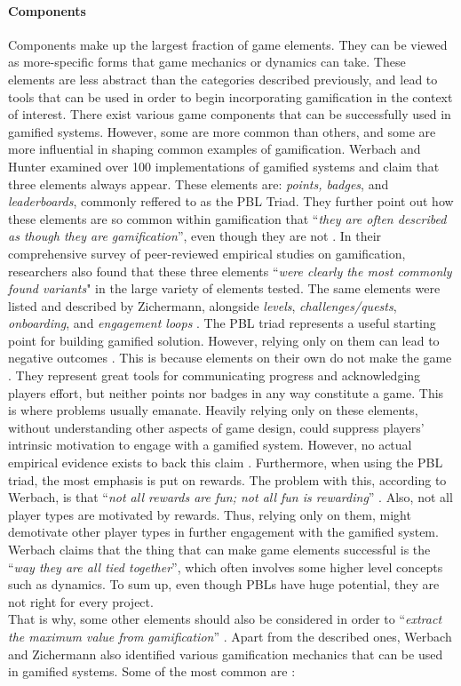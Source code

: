 \paragraph{Components}
Components make up the largest fraction of game elements. They can be viewed as more-specific forms that game mechanics or dynamics can take. These elements are less abstract than the categories described previously, and lead to tools that can be used in order to begin incorporating gamification in the context of interest. There exist various game components that can be successfully used in gamified systems. However, some are more common than others, and some are more influential in shaping common examples of gamification. Werbach and Hunter \cite{werbach2012win} examined over 100 implementations of gamified systems and claim that three elements always appear. These elements are: \textit{points, badges}, and \textit{leaderboards}, commonly reffered to as the PBL Triad. They further point out how these elements are so common within gamification that ``\textit{they are often described as though they are gamification}'', even though they are not \cite{werbach2012win}.  In their comprehensive survey of peer-reviewed empirical studies on gamification, researchers \cite{hamari2014does} also found that these three elements ``\textit{were clearly the most commonly found variants}" in the large variety of elements tested. The same elements were listed and described by Zichermann, alongside \textit{levels}, \textit{challenges/quests}, \textit{onboarding}, and \textit{engagement loops} \cite{zichermann2011gamification}. The PBL triad represents a useful starting point for building gamified solution. However, relying only on them can lead to negative outcomes \cite{werbach2012win}. This is because elements on their own do not make the game \cite{werbach2012win, WerbachCoursera}. They represent great tools for communicating progress and acknowledging players effort, but neither points nor badges in any way constitute a game. This is where problems usually emanate. Heavily relying only on these elements, without understanding other aspects of game design, could suppress players' intrinsic motivation to engage with a gamified system. However, no actual empirical evidence exists to back this claim \cite{mekler2013points}. Furthermore, when using the PBL triad, the most emphasis is put on rewards. The problem with this, according to Werbach, is that ``\textit{not all rewards are fun; not all fun is rewarding}'' \cite{WerbachCoursera}. Also, not all player types are motivated by rewards. Thus, relying only on them, might demotivate other player types in further engagement with the gamified system. Werbach claims that the thing that can make game elements successful is the ``\textit{way they are all tied together}'', which often involves some higher level concepts such as dynamics. To sum up, even though PBLs have huge potential, they are not right for every project.\\ That is why, some other elements should also be considered in order to ``\textit{extract the maximum value from gamification}'' \cite{werbach2012win}. Apart from the described ones, Werbach and Zichermann also identified various gamification mechanics that can be used in gamified systems. Some of the most common are \cite{zichermann2011gamification}:
